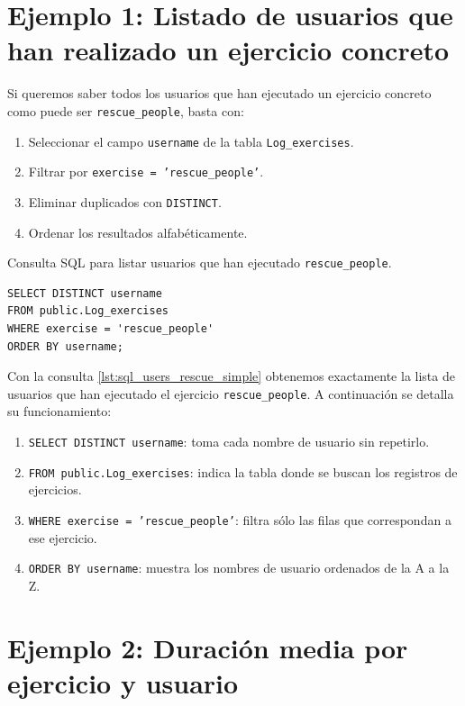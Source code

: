 \documentclass[a4paper, 12pt]{book}
\begin{document}
\section[Listado de usuarios que han realizado un ejercicio]{Ejemplo 1: Listado de usuarios que han realizado un ejercicio concreto}

Si queremos saber todos los usuarios que han ejecutado un ejercicio concreto como puede ser \texttt{rescue\_people}, basta con:

\begin{enumerate}
    \item Seleccionar el campo \texttt{username} de la tabla \texttt{Log\_exercises}.
    \item Filtrar por \texttt{exercise = 'rescue\_people'}.
    \item Eliminar duplicados con \texttt{DISTINCT}.
    \item Ordenar los resultados alfabéticamente.
\end{enumerate}

\begin{listing}[h!]
\caption{Consulta SQL para listar usuarios que han ejecutado \texttt{rescue\_people}.}{}
\label{lst:sql_users_rescue_simple}
\begin{verbatim}
SELECT DISTINCT username
FROM public.Log_exercises
WHERE exercise = 'rescue_people'
ORDER BY username;
\end{verbatim}
\end{listing}

Con la consulta \ref{lst:sql_users_rescue_simple} obtenemos exactamente la lista de usuarios que han ejecutado el ejercicio \texttt{rescue\_people}. A continuación se detalla su funcionamiento:

\begin{enumerate}
    \item \texttt{SELECT DISTINCT username}: toma cada nombre de usuario sin repetirlo.
    \item \texttt{FROM public.Log\_exercises}: indica la tabla donde se buscan los registros de ejercicios.
    \item \texttt{WHERE exercise = 'rescue\_people'}: filtra sólo las filas que correspondan a ese ejercicio.
    \item \texttt{ORDER BY username}: muestra los nombres de usuario ordenados de la A a la Z.
\end{enumerate}

\section{Ejemplo 2: Duración media por ejercicio y usuario}
\end{document}
